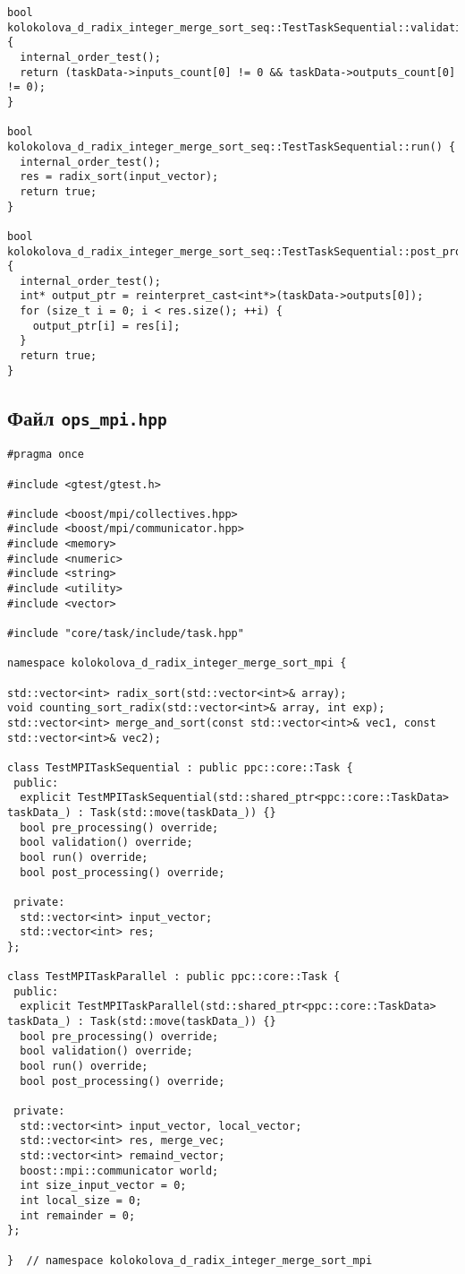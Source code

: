 \documentclass[12pt]{article}
\begin{document}
\begin{lstlisting}
bool kolokolova_d_radix_integer_merge_sort_seq::TestTaskSequential::validation() {
  internal_order_test();
  return (taskData->inputs_count[0] != 0 && taskData->outputs_count[0] != 0);
}

bool kolokolova_d_radix_integer_merge_sort_seq::TestTaskSequential::run() {
  internal_order_test();
  res = radix_sort(input_vector);
  return true;
}

bool kolokolova_d_radix_integer_merge_sort_seq::TestTaskSequential::post_processing() {
  internal_order_test();
  int* output_ptr = reinterpret_cast<int*>(taskData->outputs[0]);
  for (size_t i = 0; i < res.size(); ++i) {
    output_ptr[i] = res[i];
  }
  return true;
}
\end{lstlisting}

\subsection*{Файл \texttt{ops\_mpi.hpp}}

\begin{lstlisting}
#pragma once

#include <gtest/gtest.h>

#include <boost/mpi/collectives.hpp>
#include <boost/mpi/communicator.hpp>
#include <memory>
#include <numeric>
#include <string>
#include <utility>
#include <vector>

#include "core/task/include/task.hpp"

namespace kolokolova_d_radix_integer_merge_sort_mpi {

std::vector<int> radix_sort(std::vector<int>& array);
void counting_sort_radix(std::vector<int>& array, int exp);
std::vector<int> merge_and_sort(const std::vector<int>& vec1, const std::vector<int>& vec2);

class TestMPITaskSequential : public ppc::core::Task {
 public:
  explicit TestMPITaskSequential(std::shared_ptr<ppc::core::TaskData> taskData_) : Task(std::move(taskData_)) {}
  bool pre_processing() override;
  bool validation() override;
  bool run() override;
  bool post_processing() override;

 private:
  std::vector<int> input_vector;
  std::vector<int> res;
};

class TestMPITaskParallel : public ppc::core::Task {
 public:
  explicit TestMPITaskParallel(std::shared_ptr<ppc::core::TaskData> taskData_) : Task(std::move(taskData_)) {}
  bool pre_processing() override;
  bool validation() override;
  bool run() override;
  bool post_processing() override;

 private:
  std::vector<int> input_vector, local_vector;
  std::vector<int> res, merge_vec;
  std::vector<int> remaind_vector;
  boost::mpi::communicator world;
  int size_input_vector = 0;
  int local_size = 0;
  int remainder = 0;
};

}  // namespace kolokolova_d_radix_integer_merge_sort_mpi
\end{lstlisting}
\end{document}
